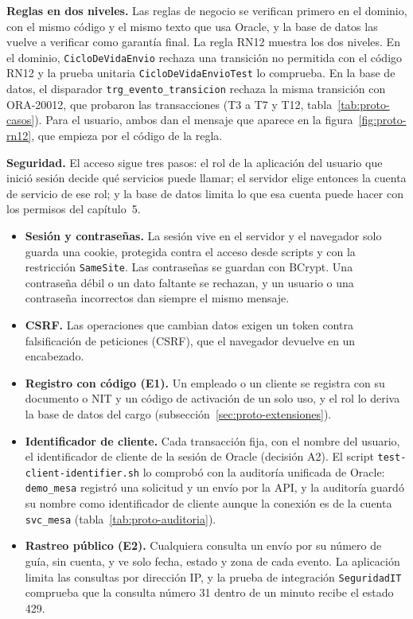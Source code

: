 \textbf{Reglas en dos niveles.} Las reglas de negocio se verifican primero en el
dominio, con el mismo código y el mismo texto que usa Oracle, y la base de
datos las vuelve a verificar como garantía final. La regla RN12 muestra los
dos niveles. En el dominio, \texttt{CicloDeVidaEnvio} rechaza una
transición no permitida con el código RN12 y la prueba unitaria
\texttt{CicloDeVidaEnvioTest} lo comprueba. En la base de datos, el disparador
\texttt{trg\_evento\_transicion} rechaza la misma transición con ORA-20012,
que probaron las transacciones (T3 a T7 y T12,
tabla~\ref{tab:proto-casos}). Para el usuario, ambos dan el mensaje que
aparece en la figura~\ref{fig:proto-rn12}, que empieza por el código de la
regla.

\textbf{Seguridad.} El acceso sigue tres pasos: el rol de la aplicación del
usuario que inició sesión decide qué servicios puede llamar; el servidor elige
entonces la cuenta de servicio de ese rol; y la base de datos limita lo que esa
cuenta puede hacer con los permisos del capítulo~5.

\begin{itemize}[itemsep=2pt]
  \item \textbf{Sesión y contraseñas.} La sesión vive en el servidor y el
        navegador solo guarda una cookie, protegida contra el acceso desde
        scripts y con la restricción \texttt{SameSite}. Las contraseñas se
        guardan con BCrypt. Una contraseña débil o un dato faltante se
        rechazan, y un usuario o una contraseña incorrectos dan siempre el
        mismo mensaje.
  \item \textbf{CSRF.} Las operaciones que cambian datos exigen un
        token contra falsificación de peticiones (CSRF), que el navegador
        devuelve en un encabezado.
  \item \textbf{Registro con código (E1).} Un empleado o un cliente se
        registra con su documento o NIT y un código de activación de un solo
        uso, y el rol lo deriva la base de datos del cargo
        (subsección~\ref{sec:proto-extensiones}).
  \item \textbf{Identificador de cliente.} Cada transacción fija, con el
        nombre del usuario, el identificador de cliente de la sesión de Oracle
        (decisión A2). El script
        \texttt{test-client-\allowbreak identifier.sh} lo comprobó
        con la auditoría unificada de Oracle: \texttt{demo\_mesa} registró una
        solicitud y un envío por la API, y la auditoría guardó su nombre como
        identificador de cliente aunque la conexión es de la cuenta
        \texttt{svc\_mesa} (tabla~\ref{tab:proto-auditoria}).
  \item \textbf{Rastreo público (E2).} Cualquiera consulta un envío por su
        número de guía, sin cuenta, y ve solo fecha, estado y zona de cada
        evento. La aplicación limita las consultas por dirección IP, y la
        prueba de integración \texttt{SeguridadIT} comprueba que la consulta
        número 31 dentro de un minuto recibe el estado 429.
\end{itemize}

